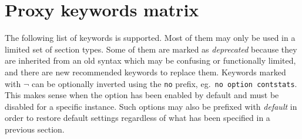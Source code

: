 
\section{Proxy keywords matrix}

\newcommand{\NO}{--}
\newcommand{\YES}{$\times$}
\newcommand{\optnopr}{ $\neg$}
\newcommand{\deprecated}[1]{\textsl{{\color{gray}#1}}}
\newcommand{\depword}[1]{\texttt{\deprecated{#1}}}

The following list of keywords is supported. Most of them may only be used in a
limited set of section types. Some of them are marked as \deprecated{deprecated} because
they are inherited from an old syntax which may be confusing or functionally
limited, and there are new recommended keywords to replace them. Keywords
marked with\optnopr{} can be optionally inverted using the \texttt{no} prefix,
eg.~\texttt{no option contstats}. This makes sense when the option has been enabled by default
and must be disabled for a specific instance. Such options may also be prefixed
with \emph{default} in order to restore default settings regardless of what has been
specified in a previous  section.


